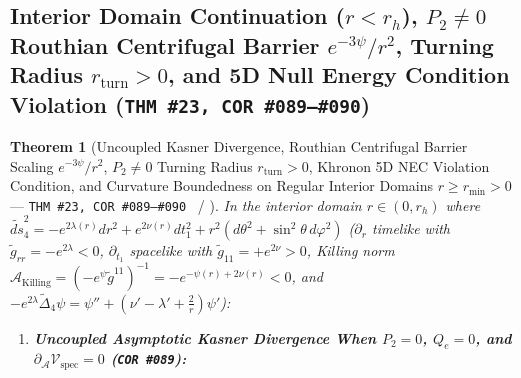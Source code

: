 \documentclass[11pt,a4paper]{article}
\newcommand{\catD}{\text{\textbf{\textcolor{blue!75!black}{[D]}}}}
\newcommand{\catH}{\text{\textbf{\textcolor{orange!80!black}{[H]}}}}
\theoremstyle{definition}
\theoremstyle{plain}
\newtheorem{theorem}[axiom]{Theorem}
\theoremstyle{remark}
\begin{document}
\subsection{Interior Domain Continuation ($r < r_h$), $P_2 \neq 0$ Routhian Centrifugal Barrier $e^{-3\psi}/r^2$, Turning Radius $r_{\mathrm{turn}} > 0$, and 5D Null Energy Condition Violation (\texttt{THM~\#23, COR~\#089--\#090})}

\begin{theorem}[{Uncoupled Kasner Divergence, Routhian Centrifugal Barrier Scaling $e^{-3\psi}/r^2$, $P_2 \neq 0$ Turning Radius $r_{\mathrm{turn}} > 0$, Khronon 5D NEC Violation Condition, and Curvature Boundedness on Regular Interior Domains $r \ge r_{\min} > 0$ --- \texttt{THM~\#23, COR~\#089--\#090} \catD\ / \catH}]\label{thm:c5_interior_continuation}\label{thm:c5_interior_kasner_regularity}
In the interior domain $r \in (0, r_h)$ where $\widetilde{ds}_4^2 = -e^{2\lambda(r)}dr^2 + e^{2\nu(r)}dt_1^2 + r^2(d\theta^2 + \sin^2\theta\,d\varphi^2)$ ($\partial_r$ timelike with $\tilde{g}_{rr} = -e^{2\lambda} < 0$, $\partial_{t_1}$ spacelike with $\tilde{g}_{11} = +e^{2\nu} > 0$, Killing norm $\mathcal{A}_{\mathrm{Killing}} = (-e^\psi\tilde{g}^{11})^{-1} = -e^{-\psi(r)+2\nu(r)} < 0$, and $-e^{2\lambda}\tilde{\Delta}_4\psi = \psi'' + (\nu' - \lambda' + \frac{2}{r})\psi'$):
\begin{enumerate}[label=(\roman*)]
  \item \textbf{Uncoupled Asymptotic Kasner Divergence When $P_2 = 0$, $Q_e = 0$, and $\partial_{\mathcal{A}}\mathcal{V}_{\mathrm{spec}} = 0$ (\texttt{COR~\#089}):}

\end{enumerate}
\end{theorem}
\end{document}
